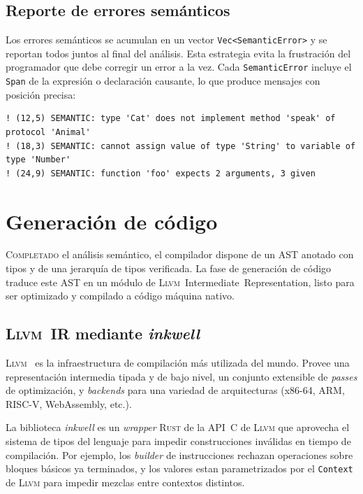 \documentclass[11pt,a4paper,oneside,openany]{report}
\newcommand{\code}[1]{\texttt{#1}}
\newcommand{\rust}{\textsc{Rust}}
\newcommand{\llvm}{\textsc{Llvm}}
\newcommand{\inkwell}{\textit{inkwell}}
\begin{document}
\section{Reporte de errores semánticos}

Los errores semánticos se acumulan en un vector \code{Vec<SemanticError>} y se
reportan todos juntos al final del análisis. Esta estrategia evita la frustración
del programador que debe corregir un error a la vez. Cada \code{SemanticError}
incluye el \code{Span} de la expresión o declaración causante, lo que produce
mensajes con posición precisa:

\begin{lstlisting}[style=base,numbers=none]
! (12,5) SEMANTIC: type 'Cat' does not implement method 'speak' of protocol 'Animal'
! (18,3) SEMANTIC: cannot assign value of type 'String' to variable of type 'Number'
! (24,9) SEMANTIC: function 'foo' expects 2 arguments, 3 given
\end{lstlisting}

\chapter{Generación de código}
\label{cap:cg}

\lettrine[lines=2,findent=2pt,nindent=0pt]{C}{ompletado} el análisis semántico, el
compilador dispone de un AST anotado con tipos y de una jerarquía de tipos
verificada. La fase de generación de código traduce este AST en un módulo de
\llvm{}~Intermediate~Representation, listo para ser optimizado y compilado a código
máquina nativo.

\section{\llvm{}~IR mediante \inkwell{}}

\llvm{}~\cite{lattner2004} es la infraestructura de compilación más utilizada del
mundo. Provee una representación intermedia tipada y de bajo nivel, un conjunto
extensible de \textit{passes} de optimización, y \textit{backends} para una variedad
de arquitecturas (x86-64, ARM, RISC-V, WebAssembly, etc.).

La biblioteca \inkwell{} es un \textit{wrapper} \rust{} de la API~C de \llvm{} que
aprovecha el sistema de tipos del lenguaje para impedir construcciones inválidas en
tiempo de compilación. Por ejemplo, los \textit{builder} de instrucciones rechazan
operaciones sobre bloques básicos ya terminados, y los valores estan parametrizados
por el \code{Context} de \llvm{} para impedir mezclas entre contextos distintos.
\end{document}
